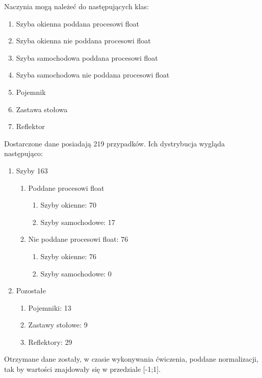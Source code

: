 \documentclass[a4paper, openright, twoside,11pt]{article}
\begin{document}
        
    Naczynia mogą należeć do następujących klas:
    \begin{enumerate}
        \item Szyba okienna poddana procesowi float
        \item Szyba okienna nie poddana procesowi float
        \item Szyba samochodowa poddana procesowi float
        \item Szyba samochodowa nie poddana procesowi float
        \item Pojemnik
        \item Zastawa stołowa
        \item Reflektor
    \end{enumerate}
    
    Dostarczone dane posiadają 219 przypadków. Ich dystrybucja wygląda następująco:
    \begin{enumerate}
        \item Szyby 163
            \begin{enumerate}
                \item Poddane procesowi float
                \begin{enumerate}
                    \item Szyby okienne: 70
                    \item Szyby samochodowe: 17
                \end{enumerate}
                \item Nie poddane procesowi float: 76 
                \begin{enumerate}
                    \item Szyby okienne: 76
                    \item Szyby samochodowe: 0
                \end{enumerate}
            \end{enumerate}
            \item Pozostałe
            \begin{enumerate}
                \item Pojemniki: 13
                \item Zastawy stołowe: 9
                \item Reflektory: 29
            \end{enumerate}
    \end{enumerate}
    Otrzymane dane zostały, w czasie wykonywania ćwiczenia, poddane normalizacji, tak by wartości znajdowały się w przedziale [-1;1].
    \clearpage
\end{document}
